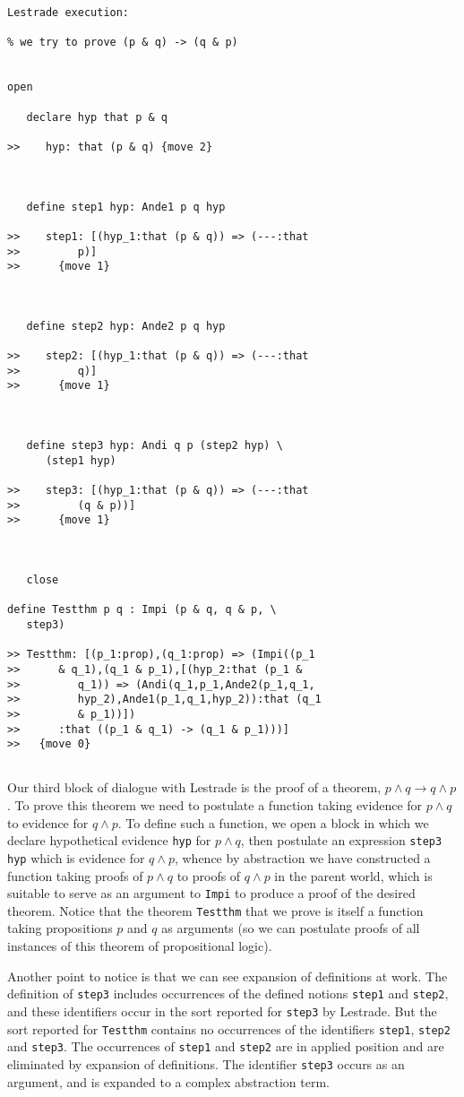 \documentclass[12pt]{article}
\begin{document}
\begin{verbatim}Lestrade execution:

% we try to prove (p & q) -> (q & p)


open

   declare hyp that p & q

>>    hyp: that (p & q) {move 2}



   define step1 hyp: Ande1 p q hyp

>>    step1: [(hyp_1:that (p & q)) => (---:that
>>         p)]
>>      {move 1}



   define step2 hyp: Ande2 p q hyp

>>    step2: [(hyp_1:that (p & q)) => (---:that
>>         q)]
>>      {move 1}



   define step3 hyp: Andi q p (step2 hyp) \
      (step1 hyp)

>>    step3: [(hyp_1:that (p & q)) => (---:that
>>         (q & p))]
>>      {move 1}



   close

define Testthm p q : Impi (p & q, q & p, \
   step3)

>> Testthm: [(p_1:prop),(q_1:prop) => (Impi((p_1
>>      & q_1),(q_1 & p_1),[(hyp_2:that (p_1 &
>>         q_1)) => (Andi(q_1,p_1,Ande2(p_1,q_1,
>>         hyp_2),Ande1(p_1,q_1,hyp_2)):that (q_1
>>         & p_1))])
>>      :that ((p_1 & q_1) -> (q_1 & p_1)))]
>>   {move 0}


\end{verbatim}

Our third block of dialogue with Lestrade is the proof of a theorem, $p \wedge q \rightarrow q \wedge p$.   To prove this theorem we need to postulate
a function taking evidence for  $p \wedge q$ to evidence for $q \wedge p$.   To define such a function, we open a block in which we declare hypothetical evidence {\tt hyp} for $p \wedge q$, then postulate an expression {\tt step3 hyp} which is evidence for $q \wedge p$, whence by abstraction we have constructed a function taking proofs
of $p \wedge q$ to proofs of $q \wedge p$ in the parent world, which is suitable to serve as an argument to {\tt Impi} to produce a proof of the desired theorem.
Notice that the theorem {\tt Testthm} that we prove is itself a function taking propositions $p$ and $q$ as arguments (so we can postulate proofs of all instances of this theorem of propositional logic).

Another point to notice is that we can see expansion of definitions at work.  The definition of {\tt step3} includes occurrences of the defined notions {\tt step1}
and {\tt step2}, and these identifiers occur in the sort reported for {\tt step3} by Lestrade.  But the sort reported for {\tt Testthm} contains no occurrences of
the identifiers {\tt step1}, {\tt step2} and {\tt step3}.  The occurrences of {\tt step1} and {\tt step2} are in applied position and are eliminated by expansion of definitions.  The identifier {\tt step3} occurs as an argument, and is expanded to a complex abstraction term.
\end{document}

